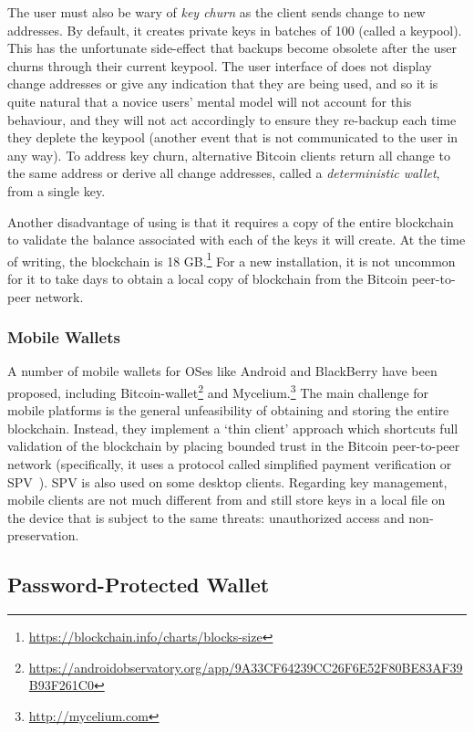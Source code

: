 The user must also be wary of \textit{key churn} as the \bitcoinclient client sends change to new addresses. By default, it creates private keys in batches of 100 (called a keypool). This has the unfortunate side-effect that backups become obsolete after the user churns through their current keypool. The user interface of \bitcoinclient does not display change addresses or give any indication that they are being used, and so it is quite natural that a novice users' mental model will not account for this behaviour, and they will not act accordingly to ensure they re-backup \walletfile each time they deplete the keypool (another event that is not communicated to the user in any way). To address key churn, alternative Bitcoin clients return all change to the same address or derive all change addresses, called a \textit{deterministic wallet}, from a single key.

Another disadvantage of using \bitcoinclient is that it requires a copy of the entire blockchain to validate the balance associated with each of the keys it will create. At the time of writing, the blockchain is 18 GB.\footnote{\url{https://blockchain.info/charts/blocks-size}} For a new installation, it is not uncommon for it to take days to obtain a local copy of blockchain from the Bitcoin peer-to-peer network.

\subsubsection{Mobile Wallets}

A number of mobile wallets for OSes like Android and BlackBerry have been proposed, including Bitcoin-wallet\footnote{\url{https://androidobservatory.org/app/9A33CF64239CC26F6E52F80BE83AF39B93F261C0}} and Mycelium.\footnote{\url{http://mycelium.com}} The main challenge for mobile platforms is the general unfeasibility of obtaining and storing the entire blockchain. Instead, they implement a `thin client' approach which shortcuts full validation of the blockchain by placing bounded trust in the Bitcoin peer-to-peer network (specifically, it uses a protocol called simplified payment verification or SPV~\cite{}). SPV is also used on some desktop clients. Regarding key management, mobile clients are not much different from \bitcoinclient and still store keys in a local file on the device that is subject to the same threats: unauthorized access and non-preservation.

\subsection{Password-Protected Wallet}

